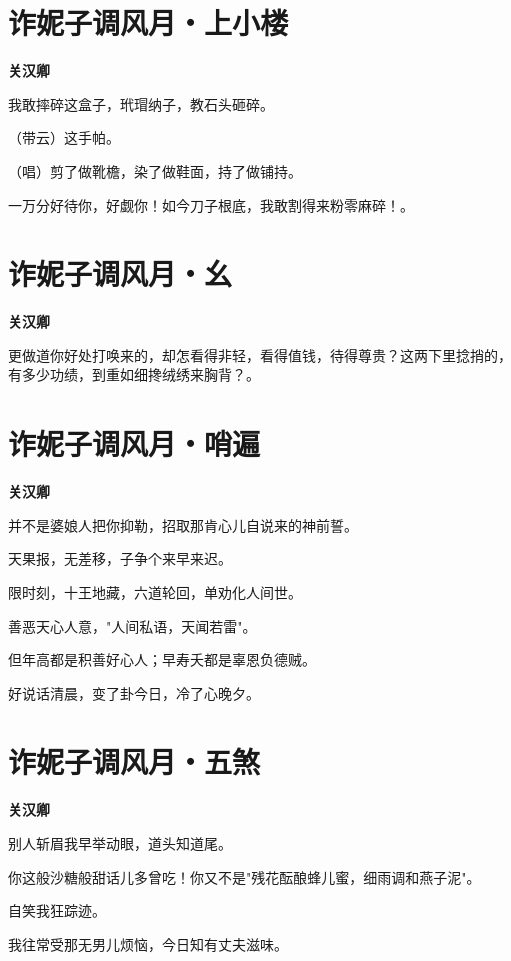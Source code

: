 \documentclass[12pt,a4paper]{ctexbook}
\begin{document}
\section{诈妮子调风月・上小楼}
\textbf{关汉卿}\par\vspace{0.5em}
我敢摔碎这盒子，玳瑁纳子，教石头砸碎。\par
（带云）这手帕。\par
（唱）剪了做靴檐，染了做鞋面，持了做铺持。\par
一万分好待你，好觑你！如今刀子根底，我敢割得来粉零麻碎！。\par

\section{诈妮子调风月・幺}
\textbf{关汉卿}\par\vspace{0.5em}
更做道你好处打唤来的，却怎看得非轻，看得值钱，待得尊贵？这两下里捻捎的，有多少功绩，到重如细搀绒绣来胸背？。\par

\section{诈妮子调风月・哨遍}
\textbf{关汉卿}\par\vspace{0.5em}
并不是婆娘人把你抑勒，招取那肯心儿自说来的神前誓。\par
天果报，无差移，子争个来早来迟。\par
限时刻，十王地藏，六道轮回，单劝化人间世。\par
善恶天心人意，"人间私语，天闻若雷"。\par
但年高都是积善好心人；早寿夭都是辜恩负德贼。\par
好说话清晨，变了卦今日，冷了心晚夕。\par

\section{诈妮子调风月・五煞}
\textbf{关汉卿}\par\vspace{0.5em}
别人斩眉我早举动眼，道头知道尾。\par
你这般沙糖般甜话儿多曾吃！你又不是"残花酝酿蜂儿蜜，细雨调和燕子泥"。\par
自笑我狂踪迹。\par
我往常受那无男儿烦恼，今日知有丈夫滋味。\par
\end{document}
